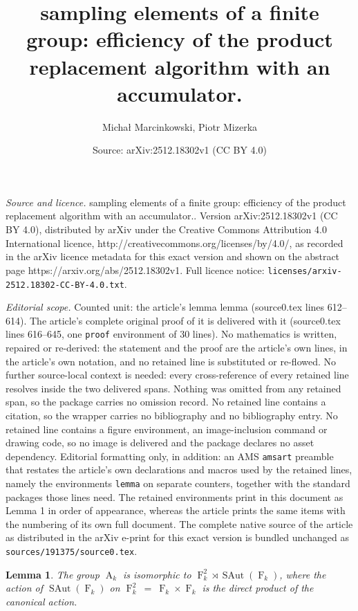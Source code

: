 \documentclass[10pt,a4paper]{amsart}
\title{sampling elements of a finite group: efficiency of the product replacement algorithm with an accumulator.}
\author{Michał Marcinkowski, Piotr Mizerka}
\date{Source: arXiv:2512.18302v1 (CC BY 4.0)}
\newtheorem{lemma}{Lemma}
\newcommand{\A}{\operatorname{A}}
\newcommand{\F}{\operatorname{F}}
\newcommand{\SAut}{\operatorname{SAut}}
\begin{document}
\maketitle

\noindent\emph{Source and licence.} sampling elements of a finite group: efficiency of the product replacement algorithm with an accumulator.. Version arXiv:2512.18302v1 (CC BY 4.0), distributed by arXiv under the Creative Commons Attribution 4.0 International licence, http://creativecommons.org/licenses/by/4.0/, as recorded in the arXiv licence metadata for this exact version and shown on the abstract page https://arxiv.org/abs/2512.18302v1. Full licence notice: \texttt{licenses/arxiv-2512.18302-CC-BY-4.0.txt}.\par\smallskip

\noindent\textit{Editorial scope.} Counted unit: the article's lemma lemma (source0.tex lines 612--614). The article's complete original proof of it is delivered with it (source0.tex lines 616--645, one \texttt{proof} environment of 30 lines). No mathematics is written, repaired or re-derived: the statement and the proof are the article's own lines, in the article's own notation, and no retained line is substituted or re-flowed.  No further source-local context is needed: every cross-reference of every retained line resolves inside the two delivered spans.  Nothing was omitted from any retained span, so the package carries no omission record.  No retained line contains a citation, so the wrapper carries no bibliography and no bibliography entry.  No retained line contains a figure environment, an image-inclusion command or drawing code, so no image is delivered and the package declares no asset dependency.  Editorial formatting only, in addition: an AMS \texttt{amsart} preamble that restates the article's own declarations and macros used by the retained lines, namely the environments \texttt{lemma} on separate counters, together with the standard packages those lines need.  The retained environments print in this document as Lemma 1 in order of appearance, whereas the article prints the same items with the numbering of its own full document.  The complete native source of the article as distributed in the arXiv e-print for this exact version is bundled unchanged as \texttt{sources/191375/source0.tex}.
\begin{lemma}
The group $\A_k$ is isomorphic to $\F_k^2 \rtimes \SAut(\F_k)$, where the action of $\SAut(\F_k)$ on $\F_k^2~=~\F_k \times \F_k$ is the direct product of the canonical action. 
\end{lemma}
\end{document}
